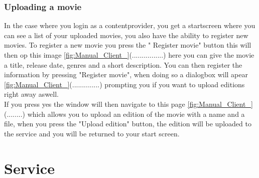 \subsubsection{Uploading a movie}
\label{Manual_Client_Navigation_Upload}
In the case where you login as a contentprovider, you get a startscreen where you can see a list of your uploaded movies, you also have the ability to register new movies. To register a new movie you press the " Register movie" button this will then op this image \ref{fig:Manual_Client_}(................) here you can give the movie a title,  release date, genres and a short description. You can then register the information by pressing "Register movie", when doing so a dialogbox will apear \ref{fig:Manual_Client_}(..............) prompting you if you want to upload editions right away aswell.
\\If you press yes the window will then navigate to this page \ref{fig:Manual_Client_}(........) which allows you to upload an edition of the movie with a name and a file, when you press the "Upload edition" button, the edition will be uploaded to the service and you will be returned to your start screen.

\section{Service}
\label{Manual_Service}